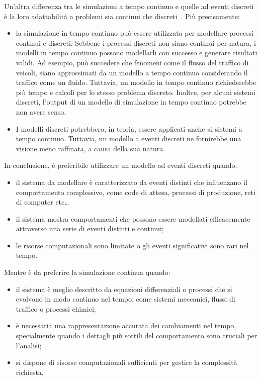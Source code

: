 \documentclass[12pt,a4paper,openright,twoside]{book}
\begin{document}
Un'altra differenza tra le simulazioni a tempo continuo e quelle ad eventi discreti è la loro adattabilità a problemi sia continui che discreti~\cite{zgn2009DiscreteVC}. Più precisamente:
\begin{itemize}
    \item la simulazione in tempo continuo può essere utilizzata per modellare processi continui e discreti. Sebbene i processi discreti non siano continui per natura, i modelli in tempo continuo possono modellarli con successo e generare risultati validi. Ad esempio, può succedere che fenomeni come il flusso del traffico di veicoli, siano approssimati da un modello a tempo continuo considerando il traffico come un fluido. Tuttavia, un modello in tempo continuo richiederebbe più tempo e calcoli per lo stesso problema discreto. Inoltre, per alcuni sistemi discreti, l'output di un modello di simulazione in tempo continuo potrebbe non avere senso.
    \item I modelli discreti potrebbero, in teoria, essere applicati anche ai sistemi a tempo continuo. Tuttavia, un modello a eventi discreti ne fornirebbe una visione meno raffinata, a causa della sua natura.
\end{itemize}

In conclusione, è preferibile utilizzare un modello ad eventi discreti quando: 
\begin{itemize}
    \item il sistema da modellare è caratterizzato da eventi distinti che influenzano il comportamento complessivo, come code di attesa, processi di produzione, reti di computer etc\dots
    \item il sistema mostra comportamenti che possono essere modellati efficacemente attraverso una serie di eventi distinti e continui; 
    \item le risorse computazionali sono limitate o gli eventi significativi sono rari nel tempo.
\end{itemize}
Mentre è da preferire la simulazione continua quando: 
\begin{itemize}
    \item il sistema è meglio descritto da equazioni differenziali o processi che si evolvono in modo continuo nel tempo, come sistemi meccanici, flussi di traffico o processi chimici; 
    \item è necessaria una rappresentazione accurata dei cambiamenti nel tempo, specialmente quando i dettagli più sottili del comportamento sono cruciali per l'analisi; 
    \item si dispone di risorse computazionali sufficienti per gestire la complessità richiesta.
\end{itemize}
\end{document}
